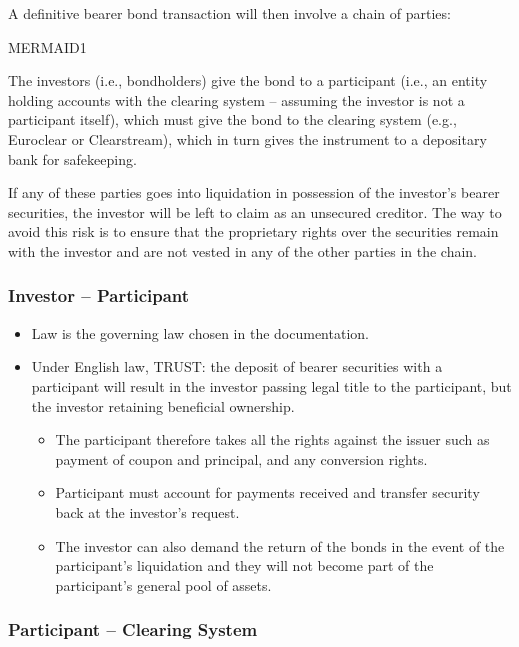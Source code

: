 \documentclass[
]{article}
\providecommand{\tightlist}{%
  \setlength{\itemsep}{0pt}\setlength{\parskip}{0pt}}
\begin{document}
A definitive bearer bond transaction will then involve a chain of
parties:

MERMAID1

The investors (i.e., bondholders) give the bond to a participant (i.e.,
an entity holding accounts with the clearing system -- assuming the
investor is not a participant itself), which must give the bond to the
clearing system (e.g., Euroclear or Clearstream), which in turn gives
the instrument to a depositary bank for safekeeping.

If any of these parties goes into liquidation in possession of the
investor's bearer securities, the investor will be left to claim as an
unsecured creditor. The way to avoid this risk is to ensure that the
proprietary rights over the securities remain with the investor and are
not vested in any of the other parties in the chain.

\hypertarget{investor-participant}{%
\subsubsection{Investor -- Participant}\label{investor-participant}}

\begin{itemize}
\tightlist
\item
  Law is the governing law chosen in the documentation.
\item
  Under English law, TRUST: the deposit of bearer securities with a
  participant will result in the investor passing legal title to the
  participant, but the investor retaining beneficial ownership.

  \begin{itemize}
  \tightlist
  \item
    The participant therefore takes all the rights against the issuer
    such as payment of coupon and principal, and any conversion rights.
  \item
    Participant must account for payments received and transfer security
    back at the investor's request.
  \item
    The investor can also demand the return of the bonds in the event of
    the participant's liquidation and they will not become part of the
    participant's general pool of assets.
  \end{itemize}
\end{itemize}

\hypertarget{participant-clearing-system}{%
\subsubsection{Participant -- Clearing
System}\label{participant-clearing-system}}
\end{document}
